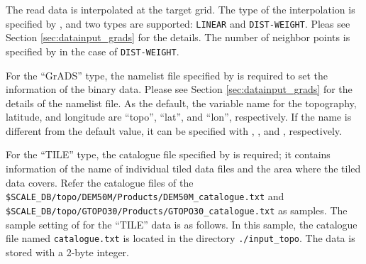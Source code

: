 The read data is interpolated at the target grid.
The type of the interpolation is specified by , and two types are supported: \verb|LINEAR| and \verb|DIST-WEIGHT|.
Pleas see Section \ref{sec:datainput_grads} for the details.
The number of neighbor points is specified by  in the case of \verb|DIST-WEIGHT|.



For the ``GrADS'' type, the namelist file specified by  is required to set the information of the \grads binary data.
Please see Section \ref{sec:datainput_grads} for the details of the namelist file.
As the default, the variable name for the topography, latitude, and longitude are ``topo'', ``lat'', and ``lon'', respectively.
If the name is different from the default value, it can be specified with , , and , respectively.


For the ``TILE'' type, the catalogue file specified by  is required;
it contains information of the name of individual tiled data files and the area where the tiled data covers.
Refer the catalogue files of the \verb|$SCALE_DB/topo/DEM50M/Products/DEM50M_catalogue.txt| and \\
\verb|$SCALE_DB/topo/GTOPO30/Products/GTOPO30_catalogue.txt| as samples.
The sample setting of  for the ``TILE'' data is as follows.
In this sample, the catalogue file named \verb|catalogue.txt| is located in the directory \verb|./input_topo|.
The data is stored with a 2-byte integer.
